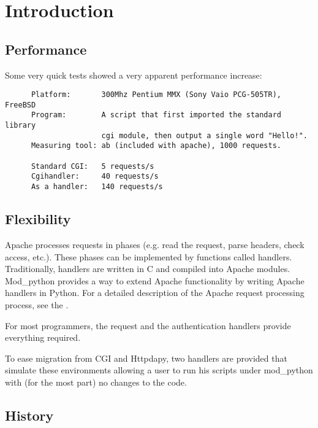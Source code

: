 \chapter{Introduction\label{introduction}}

\section{Performance\label{intr-performance}}

Some very quick tests showed a very apparent performance increase: 

\begin{verbatim}
      Platform:       300Mhz Pentium MMX (Sony Vaio PCG-505TR), FreeBSD
      Program:        A script that first imported the standard library 
                      cgi module, then output a single word "Hello!".
      Measuring tool: ab (included with apache), 1000 requests.

      Standard CGI:   5 requests/s
      Cgihandler:     40 requests/s
      As a handler:   140 requests/s
\end{verbatim}         

\section{Flexibility\label{intr-flexibility}}

Apache processes requests in phases (e.g. read the request, parse
headers, check access, etc.). These phases can be implemented by
functions called handlers. Traditionally, handlers are written in C
and compiled into Apache modules. Mod_python provides a way to extend
Apache functionality by writing Apache handlers in Python. For a
detailed description of the Apache request processing process, see the
.

For most programmers, the request and the authentication handlers
provide everything required.

To ease migration from CGI and Httpdapy, two handlers are provided
that simulate these environments allowing a user to run his scripts
under mod_python with (for the most part) no changes to the code.
 
\begin{seealso}
\end{seealso}

\section{History\label{intr-history}}


